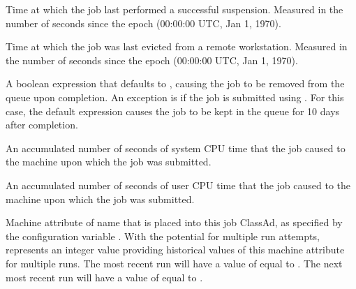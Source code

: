\begin{description}
\item[\AdAttr{LastSuspensionTime}:]  Time at which the job last performed a
successful suspension.  Measured in the number of seconds since the
epoch (00:00:00 UTC, Jan 1, 1970).

\item[\AdAttr{LastVacateTime}:]  Time at which the job was last
evicted from a remote workstation.  Measured in the number of seconds
since the epoch (00:00:00 UTC, Jan 1, 1970).

\item[\AdAttr{LeaveJobInQueue}:]  A boolean expression that defaults to
, causing the job to be removed from the queue upon completion.
An exception is if the job is submitted using .
For this case, the default expression causes the job to be kept in the queue
for 10 days after completion.

\item[\AdAttr{LocalSysCpu}:]  An accumulated number of seconds of 
system CPU time that the job caused to the machine upon which
the job was submitted.

\item[\AdAttr{LocalUserCpu}:]  An accumulated number of seconds of 
user CPU time that the job caused to the machine upon which
the job was submitted.

\item[\AdAttr{MachineAttr<X><N>}:] 
Machine attribute of name  that is placed into this job ClassAd,
as specified by the configuration variable
.
With the potential for multiple run attempts,  represents
an integer value providing historical values of this machine attribute
for multiple runs.
The most recent run will have a value of  equal to .
The next most recent run will have a value of  equal to .


\end{description}
